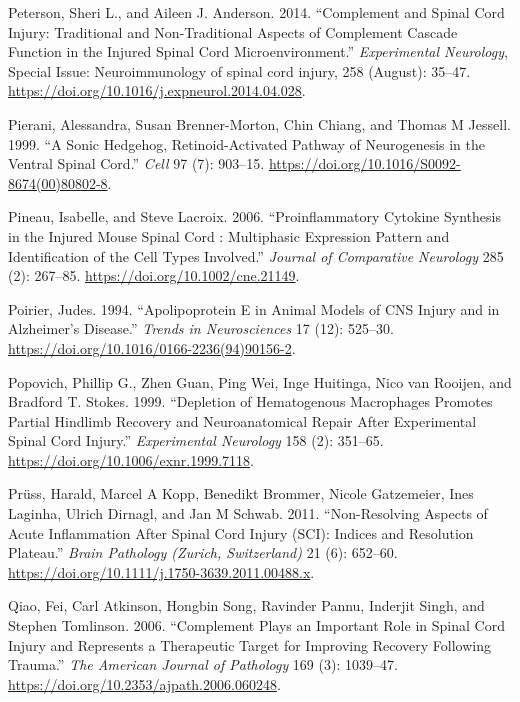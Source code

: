 \documentclass[9pt,lineno]{elife}
\newlength{\cslhangindent}
\newlength{\cslentryspacingunit} %
\newenvironment{CSLReferences}[2] %
 {%
  \setlength{\parindent}{0pt}
  \ifodd #1
  \let\oldpar\par
  \def\par{\hangindent=\cslhangindent\oldpar}
  \fi
  \setlength{\parskip}{#2\cslentryspacingunit}
 }%
 {}
\begin{document}
\begin{CSLReferences}{1}{0}
\leavevmode{}%
Peterson, Sheri L., and Aileen J. Anderson. 2014. {``Complement and Spinal Cord Injury: {Traditional} and Non-Traditional Aspects of Complement Cascade Function in the Injured Spinal Cord Microenvironment.''} \emph{Experimental Neurology}, Special {Issue}: {Neuroimmunology} of spinal cord injury, 258 (August): 35--47. \url{https://doi.org/10.1016/j.expneurol.2014.04.028}.

\leavevmode{}%
Pierani, Alessandra, Susan Brenner-Morton, Chin Chiang, and Thomas M Jessell. 1999. {``A {Sonic Hedgehog}, {Retinoid-Activated Pathway} of {Neurogenesis} in the {Ventral Spinal Cord}.''} \emph{Cell} 97 (7): 903--15. \url{https://doi.org/10.1016/S0092-8674(00)80802-8}.

\leavevmode{}%
Pineau, Isabelle, and Steve Lacroix. 2006. {``Proinflammatory {Cytokine Synthesis} in the {Injured Mouse Spinal Cord} : {Multiphasic Expression Pattern} and {Identification} of the {Cell Types Involved}.''} \emph{Journal of Comparative Neurology} 285 (2): 267--85. \url{https://doi.org/10.1002/cne.21149}.

\leavevmode{}%
Poirier, Judes. 1994. {``Apolipoprotein {E} in Animal Models of {CNS} Injury and in Alzheimer's Disease.''} \emph{Trends in Neurosciences} 17 (12): 525--30. \url{https://doi.org/10.1016/0166-2236(94)90156-2}.

\leavevmode{}%
Popovich, Phillip G., Zhen Guan, Ping Wei, Inge Huitinga, Nico van Rooijen, and Bradford T. Stokes. 1999. {``Depletion of {Hematogenous Macrophages Promotes Partial Hindlimb Recovery} and {Neuroanatomical Repair} After {Experimental Spinal Cord Injury}.''} \emph{Experimental Neurology} 158 (2): 351--65. \url{https://doi.org/10.1006/exnr.1999.7118}.

\leavevmode{}%
Prüss, Harald, Marcel A Kopp, Benedikt Brommer, Nicole Gatzemeier, Ines Laginha, Ulrich Dirnagl, and Jan M Schwab. 2011. {``Non-Resolving Aspects of Acute Inflammation After Spinal Cord Injury ({SCI}): Indices and Resolution Plateau.''} \emph{Brain Pathology (Zurich, Switzerland)} 21 (6): 652--60. \url{https://doi.org/10.1111/j.1750-3639.2011.00488.x}.

\leavevmode{}%
Qiao, Fei, Carl Atkinson, Hongbin Song, Ravinder Pannu, Inderjit Singh, and Stephen Tomlinson. 2006. {``Complement {Plays} an {Important Role} in {Spinal Cord Injury} and {Represents} a {Therapeutic Target} for {Improving Recovery} Following {Trauma}.''} \emph{The American Journal of Pathology} 169 (3): 1039--47. \url{https://doi.org/10.2353/ajpath.2006.060248}.


\end{CSLReferences}
\end{document}
